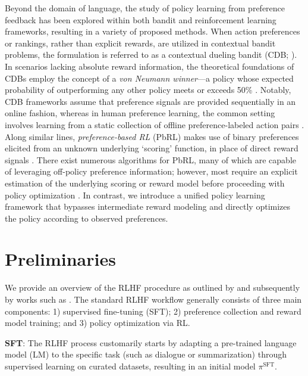 Beyond the domain of language, the study of policy learning from preference feedback has been explored within both bandit and reinforcement learning frameworks, resulting in a variety of proposed methods. When action preferences or rankings, rather than explicit rewards, are utilized in contextual bandit problems, the formulation is referred to as a contextual dueling bandit (CDB; \cite{yue2012karmed,dudik2015contextual}). In scenarios lacking absolute reward information, the theoretical foundations of CDBs employ the concept of a \textit{von Neumann winner}—a policy whose expected probability of outperforming any other policy meets or exceeds 50\% \citep{dudik2015contextual}. Notably, CDB frameworks assume that preference signals are provided sequentially in an online fashion, whereas in human preference learning, the common setting involves learning from a static collection of offline preference-labeled action pairs \citep{yan2022human}. Along similar lines, \textit{preference-based RL} (PbRL) makes use of binary preferences elicited from an unknown underlying `scoring' function, in place of direct reward signals \citep{BusaFekete2014,ruiz2023dueling}. There exist numerous algorithms for PbRL, many of which are capable of leveraging off-policy preference information; however, most require an explicit estimation of the underlying scoring or reward model before proceeding with policy optimization \citep{jain2013learning,BusaFekete2014,christiano2017deep,sadigh2017active,kupcsik2018learning}. In contrast, we introduce a unified policy learning framework that bypasses intermediate reward modeling and directly optimizes the policy according to observed preferences.

\section{Preliminaries}\label{section:prelims}

We provide an overview of the RLHF procedure as outlined by \citeauthor{ziegler2020finetuning} and subsequently by works such as \citep{stiennon2022learning, bai2022training, ouyang2022training}. The standard RLHF workflow generally consists of three main components: 1) supervised fine-tuning (SFT); 2) preference collection and reward model training; and 3) policy optimization via RL.

\textbf{SFT}: The RLHF process customarily starts by adapting a pre-trained language model (LM) to the specific task (such as dialogue or summarization) through supervised learning on curated datasets, resulting in an initial model $\pi^\text{SFT}$.

